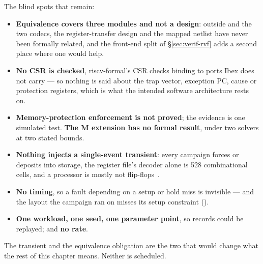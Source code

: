 The blind spots that remain:

\begin{itemize}
\item \textbf{Equivalence covers three modules and not a design}: outside  and the two codecs, the register-transfer design and the mapped netlist have never been formally related, and the front-end split of \S\ref{sec:verif-rvf} adds a second place where one would help.
\item \textbf{No CSR is checked}, riscv-formal's CSR checks binding to ports Ibex does not carry --- so nothing is said about the trap vector, exception PC, cause or protection registers, which is what the intended software architecture rests on.
\item \textbf{Memory-protection enforcement is not proved}; the evidence
is one simulated test. \textbf{The M extension has no formal result},
under two solvers at two stated bounds.
\item \textbf{Nothing injects a single-event transient}: every campaign forces or deposits into storage, the register file's decoder alone is 528 combinational cells, and a processor is mostly not flip-flops~\cite{shivakumar2002}.
\item \textbf{No timing}, so a fault depending on a setup or hold miss is invisible --- and the layout the campaign ran on misses its setup constraint ().
\item \textbf{One workload, one seed, one parameter point}, so records could be replayed; and \textbf{no rate}.
\end{itemize}

The transient and the equivalence obligation are the two that would change what the rest of this chapter means. Neither is scheduled.
